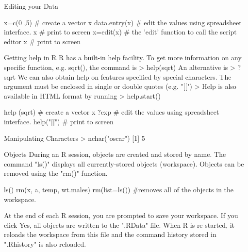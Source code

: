 \begin{frame}
\begin{frame}
Editing your Data

x=c(0 ,5)     	      # create a vector x
data.entry(x)  	   # edit the values using spreadsheet interface.
x  	                     # print to screen
x=edit(x)	          # the 'edit' function to call the script editor
x  	                     # print to screen

\end{frame}
\begin{frame}

Getting help in R
R has a built-in help facility. To get more information on any specific function, e.g. sqrt(), the command is
> help(sqrt)
An alternative is
> ? sqrt
We can also obtain help on features specified by special characters.
The argument must be enclosed in single or double quotes (e.g. "[[")
> 
Help is also available in HTML format by running
> help.start()


\end{frame}
\begin{frame}
help (sqrt)   	      # create a vector x
?exp  	   		  # edit the values using spreadsheet interface.
help("[[")	         # print to screen

\end{frame}
\begin{frame}
Manipulating Characters
> nchar("oscar")
[1] 5

Objects
During an R session, objects are created and stored by name. The command "ls()" displays all currently-stored objects (workspace). Objects can be removed using the "rm()" function.

\end{frame}
\begin{frame}

ls()
rm(x, a, temp, wt.males)
rm(list=ls())								#removes all of the objects in the workspace.


At the end of each R session, you are prompted to save your workspace. If you click Yes, all objects are written to the ".RData" file. 
When R is re-started, it reloads the workspace from this file and the command history stored in ".Rhistory" is also reloaded.


\end{frame}
\end{frame}
